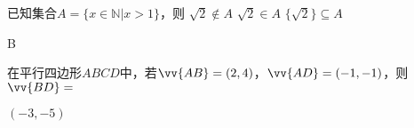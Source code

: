     \item    已知集合$A=\{x\in\mathbb{N}|x>1\}$，则\xz
    {$\sqrt2\notin A$}
    {$\sqrt2\in A$}
    {$\{\sqrt2\}\subseteq A$}
    \begin{answer}
    B
    \end{answer}
    \item
    在平行四边形$ABCD$中，若$\vv{AB}=(2,4)$，$\vv{AD}=(-1,-1)$，则$\vv{BD}=$\tk
    \begin{answer}
    $(-3,-5)$
    \end{answer}

